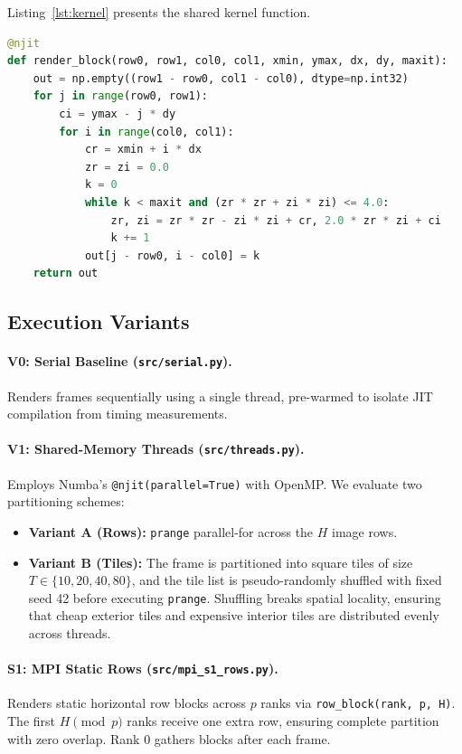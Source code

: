 \documentclass[11pt,a4paper]{article}
\begin{document}
Listing~\ref{lst:kernel} presents the shared kernel function.

\begin{lstlisting}[language=Python, caption={Core Mandelbrot block kernel in \texttt{src/fractal\_core.py}.}, label={lst:kernel}]
@njit
def render_block(row0, row1, col0, col1, xmin, ymax, dx, dy, maxit):
    out = np.empty((row1 - row0, col1 - col0), dtype=np.int32)
    for j in range(row0, row1):
        ci = ymax - j * dy
        for i in range(col0, col1):
            cr = xmin + i * dx
            zr = zi = 0.0
            k = 0
            while k < maxit and (zr * zr + zi * zi) <= 4.0:
                zr, zi = zr * zr - zi * zi + cr, 2.0 * zr * zi + ci
                k += 1
            out[j - row0, i - col0] = k
    return out
\end{lstlisting}

\subsection{Execution Variants}
\paragraph{V0: Serial Baseline (\texttt{src/serial.py}).} Renders frames sequentially using a single thread, pre-warmed to isolate JIT compilation from timing measurements.

\paragraph{V1: Shared-Memory Threads (\texttt{src/threads.py}).} Employs Numba's \texttt{@njit(parallel=True)} with OpenMP. We evaluate two partitioning schemes:
\begin{itemize}
    \item \textbf{Variant A (Rows):} \texttt{prange} parallel-for across the $H$ image rows.
    \item \textbf{Variant B (Tiles):} The frame is partitioned into square tiles of size $T \in \{10, 20, 40, 80\}$, and the tile list is pseudo-randomly shuffled with fixed seed 42 before executing \texttt{prange}. Shuffling breaks spatial locality, ensuring that cheap exterior tiles and expensive interior tiles are distributed evenly across threads.
\end{itemize}

\paragraph{S1: MPI Static Rows (\texttt{src/mpi\_s1\_rows.py}).} Renders static horizontal row blocks across $p$ ranks via \texttt{row\_block(rank, p, H)}. The first $H \pmod p$ ranks receive one extra row, ensuring complete partition with zero overlap. Rank 0 gathers blocks after each frame.
\end{document}
